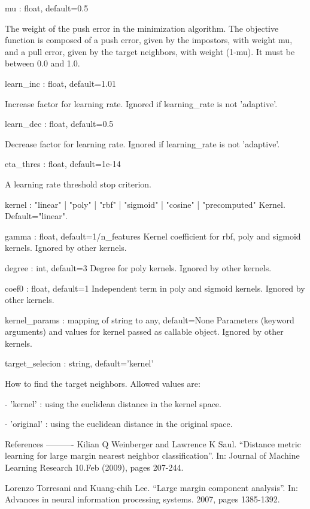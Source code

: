 \begin{DoxyVerb}
mu : float, default=0.5

    The weight of the push error in the minimization algorithm. The objective function is composed of a push error, given by the impostors,
    with weight mu, and a pull error, given by the target neighbors, with weight (1-mu). It must be between 0.0 and 1.0.

learn_inc : float, default=1.01

    Increase factor for learning rate. Ignored if learning_rate is not 'adaptive'.

learn_dec : float, default=0.5

    Decrease factor for learning rate. Ignored if learning_rate is not 'adaptive'.

eta_thres : float, default=1e-14

    A learning rate threshold stop criterion.

kernel : "linear" | "poly" | "rbf" | "sigmoid" | "cosine" | "precomputed"
    Kernel. Default="linear".

gamma : float, default=1/n_features
    Kernel coefficient for rbf, poly and sigmoid kernels. Ignored by other
    kernels.

degree : int, default=3
    Degree for poly kernels. Ignored by other kernels.

coef0 : float, default=1
    Independent term in poly and sigmoid kernels.
    Ignored by other kernels.

kernel_params : mapping of string to any, default=None
    Parameters (keyword arguments) and values for kernel passed as
    callable object. Ignored by other kernels.

target_selecion : string, default='kernel'

    How to find the target neighbors. Allowed values are:

    - 'kernel' : using the euclidean distance in the kernel space.

    - 'original' : using the euclidean distance in the original space.

References
----------
    Kilian Q Weinberger and Lawrence K Saul. “Distance metric learning for large margin nearest
    neighbor classification”. In: Journal of Machine Learning Research 10.Feb (2009), pages 207-244.

    Lorenzo Torresani and Kuang-chih Lee. “Large margin component analysis”. In: Advances in neural
    information processing systems. 2007, pages 1385-1392.
\end{DoxyVerb}
 

